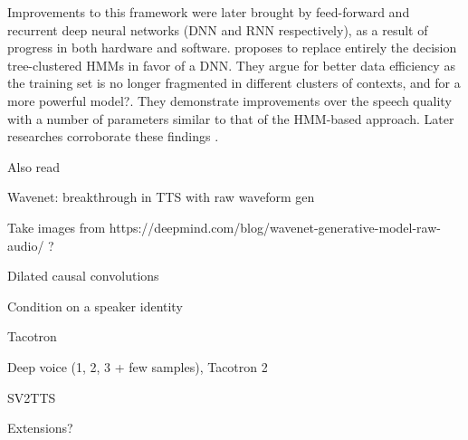 \documentclass[a4paper, oneside]{article}
\begin{document}
Improvements to this framework were later brought by feed-forward and recurrent deep neural networks (DNN and RNN respectively), as a result of progress in both hardware and software. \cite{SPSSDNN} proposes to replace entirely the decision tree-clustered HMMs in favor of a DNN. They argue for better data efficiency as the training set is no longer fragmented in different clusters of contexts\color{red}, and for a more powerful model?\color{black}. They demonstrate improvements over the speech quality with a number of parameters similar to that of the HMM-based approach. Later researches corroborate these findings \cite{OnTheTrainingAspects}.


\color{red}
Also read \cite{Yin2014ModelingDP}
\color{black}


\color{red}


Wavenet: breakthrough in TTS with raw waveform gen

Take images from https://deepmind.com/blog/wavenet-generative-model-raw-audio/ ?

Dilated causal convolutions

Condition on a speaker identity

Tacotron

Deep voice (1, 2, 3 + few samples), Tacotron 2

SV2TTS

Extensions?
\color{black}



\color{red}
\color{black}

\clearpage

 























\end{document}
